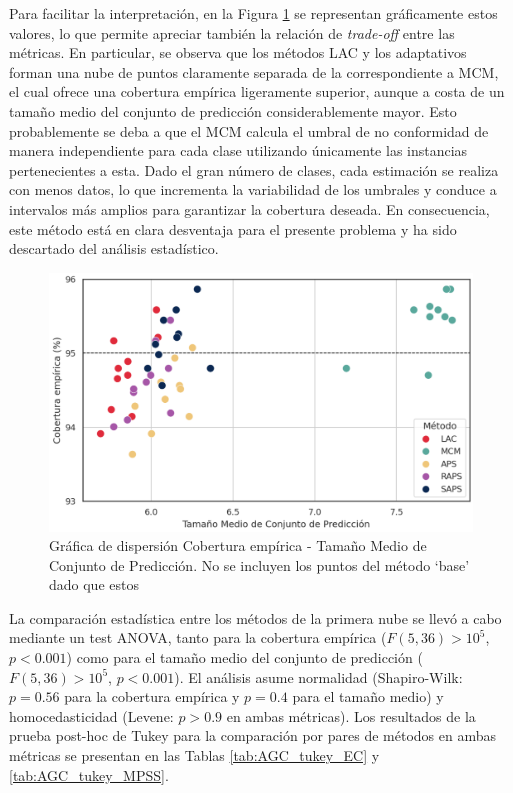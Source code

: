 Para facilitar la interpretación, en la Figura \ref{fig:AGC_scatterplot_EC-MPSS} se representan gráficamente estos valores, lo que permite apreciar también la relación de \textit{trade-off} entre las métricas. En particular, se observa que los métodos LAC y los adaptativos forman una nube de puntos claramente separada de la correspondiente a MCM, el cual ofrece una cobertura empírica ligeramente superior, aunque a costa de un tamaño medio del conjunto de predicción considerablemente mayor. Esto probablemente se deba a que el MCM calcula el umbral de no conformidad de manera independiente para cada clase utilizando únicamente las instancias pertenecientes a esta. Dado el gran número de clases, cada estimación se realiza con menos datos, lo que incrementa la variabilidad de los umbrales y conduce a intervalos más amplios para garantizar la cobertura deseada. En consecuencia, este método está en clara desventaja para el presente problema y ha sido descartado del análisis estadístico.

\begin{figure}[htbp]
    \centering
    \includegraphics[width=\textwidth]{capitulos/cap_05/imagenes/AGC_scatterplot_EC_MPSS.png}
    \caption[
        Gráfica de dispersión Cobertura empírica - Tamaño Medio de Conjunto de Predicción.
    ]{
        Gráfica de dispersión Cobertura empírica - Tamaño Medio de Conjunto de Predicción. No se incluyen los puntos del método `base' dado que estos 
    }
    \label{fig:AGC_scatterplot_EC-MPSS}
\end{figure}

La comparación estadística entre los métodos de la primera nube se llevó a cabo mediante un test ANOVA, tanto para la cobertura empírica ($F(5, 36) > 10^5$, $p<0.001$) como para el tamaño medio del conjunto de predicción ($F(5, 36) > 10^5$, $p<0.001$). El análisis asume normalidad (Shapiro-Wilk: $p=0.56$ para la cobertura empírica y $p=0.4$ para el tamaño medio) y homocedasticidad (Levene: $p>0.9$ en ambas métricas). Los resultados de la prueba post-hoc de Tukey para la comparación por pares de métodos en ambas métricas se presentan en las Tablas \ref{tab:AGC_tukey_EC} y \ref{tab:AGC_tukey_MPSS}.

